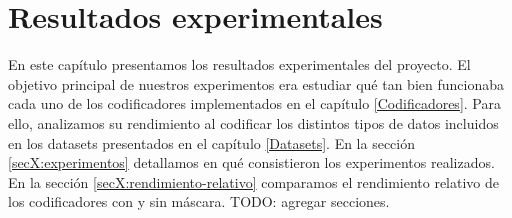 
\chapter{Resultados experimentales} %

\label{Experimentos} %


\newcommand{\maskalgo}{\textit{M}}
\newcommand{\NOmaskalgo}{\textit{NM}}
\newcommand{\coder}{\textit{c}}
\newcommand{\difrelativa}{\textit{DiferenciaRelativa}}
\newcommand{\tasacompresion}{\textit{TasaDeCompresión}}
\newcommand{\nmbits}{\NOmaskalgo_{\textit{S}}}
\newcommand{\mbits}{\maskalgo_\textit{S}}
\newcommand{\cmaskalgo}{$c_\maskalgo$}
\newcommand{\cNOmaskalgo}{$c_\NOmaskalgo$}





En este capítulo presentamos los resultados experimentales del proyecto. El objetivo principal de nuestros experimentos era estudiar qué tan bien funcionaba cada uno de los codificadores implementados en el capítulo \ref{Codificadores}. Para ello, analizamos su rendimiento al codificar los distintos tipos de datos incluidos en los datasets presentados en el capítulo \ref{Datasets}. En la sección \ref{secX:experimentos} detallamos en qué consistieron los experimentos realizados. En la sección \ref{secX:rendimiento-relativo} comparamos el rendimiento relativo de los codificadores con y sin máscara. TODO: agregar secciones.











